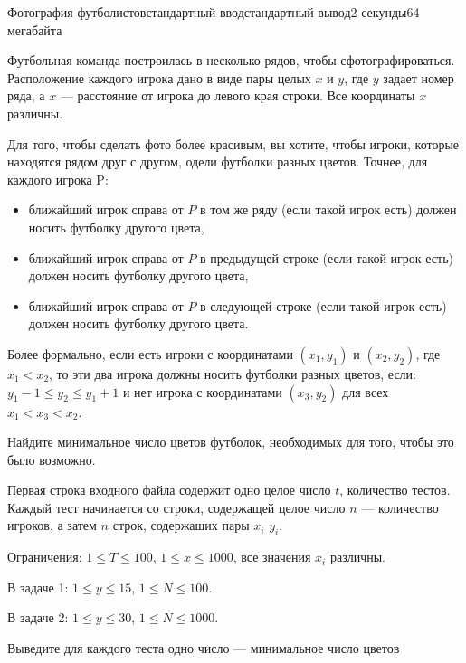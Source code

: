 \begin{problem}{Фотография футболистов}{стандартный ввод}{стандартный вывод}{2 секунды}{64 мегабайта}

Футбольная команда построилась в несколько рядов, чтобы сфотографироваться. Расположение каждого игрока дано в виде пары целых $x$ и $y$, где $y$ задает номер ряда, а  $x$ --- расстояние от игрока до левого края строки. Все координаты $x$ различны.

Для того, чтобы сделать фото более красивым, вы хотите, чтобы игроки, которые находятся рядом друг с другом, одели футболки разных цветов. Точнее, для каждого игрока P:
\begin{itemize}
\item ближайший игрок справа от $P$ в том же ряду (если такой игрок есть) должен носить футболку другого цвета,
\item ближайший игрок справа от $P$ в предыдущей строке (если такой игрок есть) должен носить футболку другого цвета,
\item ближайший игрок справа от $P$ в следующей строке (если такой игрок есть) должен носить футболку другого цвета.
\end{itemize}

Более формально, если есть игроки с координатами $(x_1, y_1)$ и $(x_2, y_2)$, где $x_1 <x_2$, то эти два игрока должны 
носить футболки разных цветов, если: $y_1 - 1\le y_2 \le y_1 + 1$ и нет игрока с координатами $(x_3, y_2)$ для всех $x_1 <x_3 <x_2$.

Найдите минимальное число цветов футболок, необходимых для того, чтобы это было возможно.


\InputFile
Первая строка входного файла содержит одно целое число $t$, количество тестов. Каждый тест начинается со строки, содержащей целое число $n$ --- количество игроков, а затем $n$ строк, содержащих пары $x_i$ $y_i$.

Ограничения: $1\le T\le 100$, $1\le x\le 1000$, все значения $x_i$ различны.

В задаче 1: $1\le y\le 15$, $1\le N\le 100$.

В задаче 2: $1\le y\le 30$, $1\le N\le 1000$.


\OutputFile
Выведите для каждого теста одно число --- минимальное число цветов

\Examples

\begin{example}
%
\end{example}

\end{problem}
